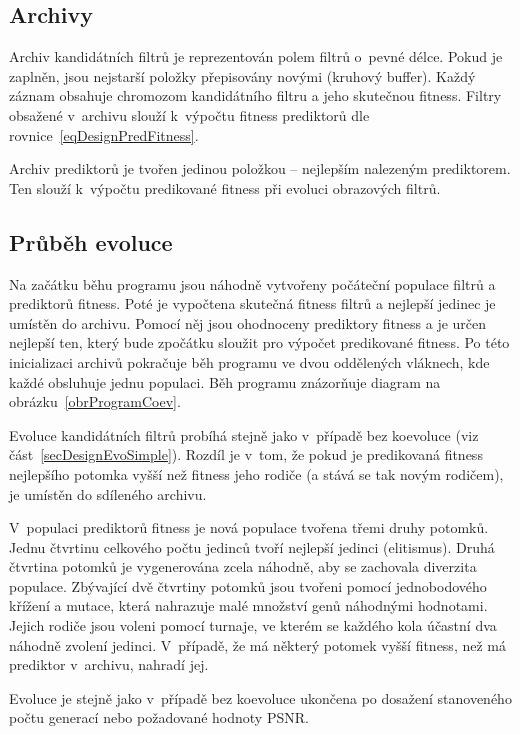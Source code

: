\subsection{Archivy}

Archiv kandidátních filtrů je reprezentován polem filtrů o~pevné délce. Pokud je zaplněn, jsou nejstarší položky přepisovány novými (kruhový buffer). Každý záznam obsahuje chromozom kandidátního filtru a jeho skutečnou fitness. Filtry obsažené v~archivu slouží k~výpočtu fitness prediktorů dle rovnice~\ref{eqDesignPredFitness}.

Archiv prediktorů je tvořen jedinou položkou -- nejlepším nalezeným prediktorem. Ten slouží k~výpočtu predikované fitness při evoluci obrazových filtrů.

\subsection{Průběh evoluce}

Na začátku běhu programu jsou náhodně vytvořeny počáteční populace filtrů a prediktorů fitness. Poté je vypočtena skutečná fitness filtrů a nejlepší jedinec je umístěn do archivu. Pomocí něj jsou ohodnoceny prediktory fitness a je určen nejlepší ten, který bude zpočátku sloužit pro výpočet predikované fitness. Po této inicializaci archivů pokračuje běh programu ve dvou oddělených vláknech, kde každé obsluhuje jednu populaci. Běh programu znázorňuje diagram na obrázku~\ref{obrProgramCoev}.

Evoluce kandidátních filtrů probíhá stejně jako v~případě bez koevoluce (viz část~\ref{secDesignEvoSimple}). Rozdíl je v~tom, že pokud je predikovaná fitness nejlepšího potomka vyšší než fitness jeho rodiče (a stává se tak novým rodičem), je umístěn do sdíleného archivu.

V~populaci prediktorů fitness je nová populace tvořena třemi druhy potomků. Jednu čtvrtinu celkového počtu jedinců tvoří nejlepší jedinci (elitismus). Druhá čtvrtina potomků je vygenerována zcela náhodně, aby se zachovala diverzita populace. Zbývající dvě čtvrtiny potomků jsou tvořeni pomocí jednobodového křížení a mutace, která nahrazuje malé množství genů náhodnými hodnotami. Jejich rodiče jsou voleni pomocí turnaje, ve kterém se každého kola účastní dva náhodně zvolení jedinci. V~případě, že má některý potomek vyšší fitness, než má prediktor v~archivu, nahradí jej.

Evoluce je stejně jako v~případě bez koevoluce ukončena po dosažení stanoveného počtu generací nebo požadované hodnoty PSNR.

